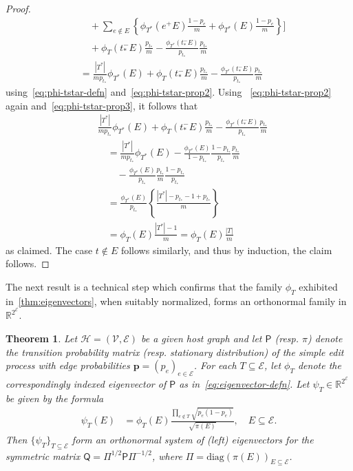 \documentclass[11pt,a4paper]{article}
\newtheorem{theorem}{Theorem}[section]
\begin{document}
\begin{proof}
\begin{align*}
            &\quad + \sum_{e\notin E} \left\{\phi_{T^\ast}(e^+ E)\frac{1-p_e}{m} + \phi_{T^\ast}(E)\frac{1-p_e}{m}\right\}\biggr ] \\
            &\quad + \phi_{T}(t_\ast^- E)\frac{p_{t_\ast}}{m} - \frac{\phi_{T^\ast}(t_\ast^- E)}{p_{t_\ast}} \frac{p_{t_\ast}}{m}\\
            &= \frac{|T^\ast|}{m p_{t_\ast}}\phi_{T^\ast}(E)+ \phi_{T}(t_\ast^- E)\frac{p_{t_\ast}}{m} - \frac{\phi_{T^\ast}(t_\ast^- E)}{p_{t_\ast}} \frac{p_{t_\ast}}{m}
        \end{align*}
    using~\cref{eq:phi-tstar-defn} and~\cref{eq:phi-tstar-prop2}. Using ~\cref{eq:phi-tstar-prop2} again and~\cref{eq:phi-tstar-prop3}, it follows that
        \begin{align*}
            &\frac{|T^\ast|}{m p_{t_\ast}}\phi_{T^\ast}(E)+ \phi_{T}(t_\ast^- E)\frac{p_{t_\ast}}{m} - \frac{\phi_{T^\ast}(t_\ast^- E)}{p_{t_\ast}} \frac{p_{t_\ast}}{m}\\
            &\quad=\frac{|T^\ast|}{m p_{t_\ast}}\phi_{T^\ast}(E)- \frac{\phi_{T^\ast}(E)}{1-p_{t_\ast}}\frac{1-p_{t_\ast}}{p_{t_\ast}} \frac{p_{t_\ast}}{m}\\
            &\quad\quad- \frac{\phi_{T^\ast}(E)}{p_{t_\ast}} \frac{p_{t_\ast}}{m} \frac{1-p_{t_\ast}}{p_{t_\ast}}\\
            &\quad= \frac{\phi_{T^\ast}(E)}{p_{t_\ast}}\left\{\frac{|T^\ast| - p_{t_\ast} - 1 + p_{t_\ast}}{m}\right\}\\
            &\quad= \phi_{T}(E)\frac{|T^\ast| - 1}{m}  = \phi_T(E) \frac{|T|}{m}
        \end{align*}
    as claimed. The case $t\notin E$ follows similarly, and thus by induction, the claim follows.
\end{proof}

The next result is a technical step which confirms that the family $\phi_T$ exhibited in~\cref{thm:eigenvectors}, when suitably normalized, forms an orthonormal family in $\mathbb{R}^{2^\mathcal{E}}$.

\begin{theorem}\label{thm:orthonormality}
    Let $\mathcal{H}=(\mathcal{V}, \mathcal{E})$ be a given host graph and let $\mathsf{P}$ (resp. $\pi$) denote the transition probability matrix (resp. stationary distribution) of the simple edit process with edge probabilities $\mathbf{p} = (p_e)_{e\in\mathcal{E}}$. For each $T\subseteq\mathcal{E}$, let $\phi_T$ denote the correspondingly indexed eigenvector of $\mathsf{P}$ as in~\cref{eq:eigenvector-defn}. Let $\psi_T\in\mathbb{R}^{2^\mathcal{E}}$ be given by the formula
        \begin{align*}
            \psi_T(E) &=\phi_T(E)  \frac{\prod_{e\notin T} \sqrt{p_e(1-p_e)}}{\sqrt{\pi(E)}},\quad E\subseteq\mathcal{E}.
        \end{align*}
    Then $\{\psi_T\}_{T\subseteq \mathcal{E}}$ form an orthonormal system of (left) eigenvectors for the symmetric matrix $\mathsf{Q} = \Pi^{1/2}\mathsf{P}\Pi^{-1/2}$, where $\Pi = \mathrm{diag}(\pi(E))_{E\subseteq\mathcal{E}}$.
\end{theorem}
\end{document}
